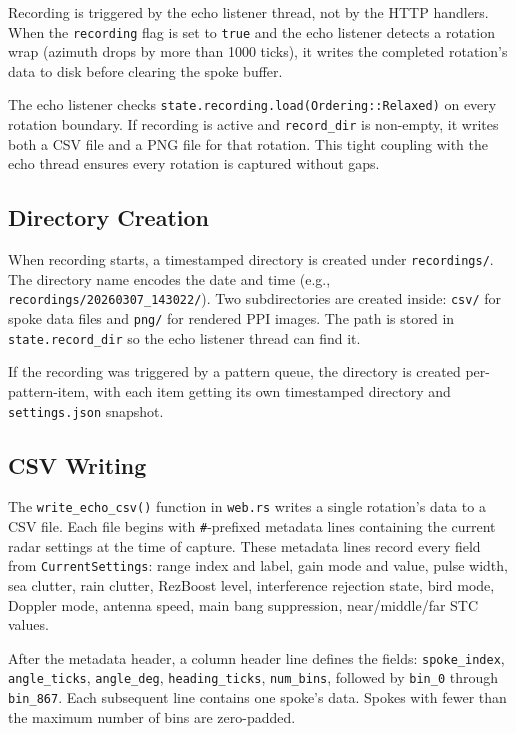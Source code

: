 \documentclass[11pt,letterpaper]{article}
\begin{document}
Recording is triggered by the echo listener thread, not by the HTTP handlers. When the \texttt{recording} flag is set to \texttt{true} and the echo listener detects a rotation wrap (azimuth drops by more than 1000 ticks), it writes the completed rotation's data to disk before clearing the spoke buffer.

The echo listener checks \texttt{state.recording.load(Ordering::Relaxed)} on every rotation boundary. If recording is active and \texttt{record\_dir} is non-empty, it writes both a CSV file and a PNG file for that rotation. This tight coupling with the echo thread ensures every rotation is captured without gaps.

\subsection{Directory Creation}
\label{subsec:recording-directory-creation}

When recording starts, a timestamped directory is created under \texttt{recordings/}. The directory name encodes the date and time (e.g., \texttt{recordings/20260307\_143022/}). Two subdirectories are created inside: \texttt{csv/} for spoke data files and \texttt{png/} for rendered PPI images. The path is stored in \texttt{state.record\_dir} so the echo listener thread can find it.

If the recording was triggered by a pattern queue, the directory is created per-pattern-item, with each item getting its own timestamped directory and \texttt{settings.json} snapshot.

\subsection{CSV Writing}
\label{subsec:recording-csv-writing}

The \texttt{write\_echo\_csv()} function in \texttt{web.rs} writes a single rotation's data to a CSV file. Each file begins with \texttt{\#}-prefixed metadata lines containing the current radar settings at the time of capture. These metadata lines record every field from \texttt{CurrentSettings}: range index and label, gain mode and value, pulse width, sea clutter, rain clutter, RezBoost level, interference rejection state, bird mode, Doppler mode, antenna speed, main bang suppression, near/middle/far STC values.

After the metadata header, a column header line defines the fields: \texttt{spoke\_index}, \texttt{angle\_ticks}, \texttt{angle\_deg}, \texttt{heading\_ticks}, \texttt{num\_bins}, followed by \texttt{bin\_0} through \texttt{bin\_867}. Each subsequent line contains one spoke's data. Spokes with fewer than the maximum number of bins are zero-padded.
\end{document}

